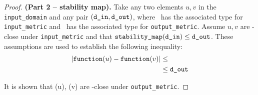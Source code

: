 \documentclass{article}
\begin{document}
\begin{proof} \textbf{(Part 2 -- stability map).} 
    Take any two elements $u, v$ in the \\\texttt{input\_domain} and any pair $(\texttt{d\_in}, \texttt{d\_out})$, 
    where \din\ has the associated type for \texttt{input\_metric} and \dout\ has the associated type for \texttt{output\_metric}.
    Assume $u, v$ are \din-close under \texttt{input\_metric} and that $\texttt{stability\_map}(\texttt{d\_in}) \leq \texttt{d\_out}$. 
    These assumptions are used to establish the following inequality:
    \begin{align*}
        |\texttt{function}(u) - \texttt{function}(v)| &\leq \\
        &\leq \texttt{d\_out}
    \end{align*}

    It is shown that \function(u), \function(v) are \dout-close under \texttt{output\_metric}.
\end{proof}
\end{document}
